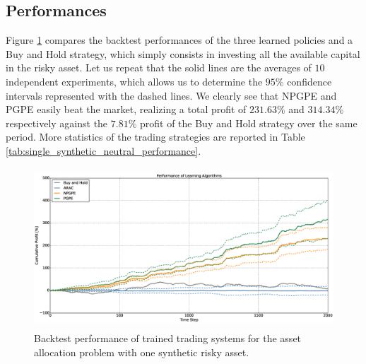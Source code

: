 \subsection{Performances}
Figure \ref{fig:single_synthetic_neutral_performance} compares the backtest performances of the three learned policies and a Buy and Hold strategy, which simply consists in investing all the available capital in the risky asset. Let us repeat that the solid lines are the averages of $10$ independent experiments, which allows us to determine the $95\%$ confidence intervals represented with the dashed lines. We clearly see that NPGPE and PGPE easily beat the market, realizing a total profit of $231.63\%$ and $314.34\%$ respectively against the $7.81\%$ profit of the Buy and Hold strategy over the same period. More statistics of the trading strategies are reported in Table \ref{tab:single_synthetic_neutral_performance}.
\begin{figure}[t]
	\centering
	\includegraphics[height=6cm,width=1.0\textwidth]{Images/6_1_single_synthetic_neutral_performance}
	\caption[Backtest performance with one synthetic risky asset]{Backtest performance of trained trading systems for the asset allocation problem with one synthetic risky asset.}
	\label{fig:single_synthetic_neutral_performance}
\end{figure}
